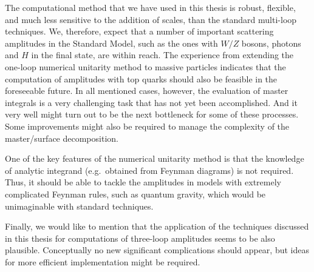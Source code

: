 The computational method that we have used in this thesis is robust, flexible,
and much less sensitive to the addition of scales, than the standard multi-loop techniques.
We, therefore, expect that a number of important scattering amplitudes
in the Standard Model, such as the ones with $W/Z$ bosons, photons and $H$ in the final state, are within reach.
The experience from extending the one-loop numerical unitarity method to massive particles indicates that
the computation of amplitudes with top quarks should also be feasible in the foreseeable future.
In all mentioned cases, however, the evaluation of master integrals is a very challenging task that has not yet been accomplished.
And it very well might turn out to be the next bottleneck for some of these processes.
Some improvements might also be required to manage the complexity of the master/surface decomposition.

One of the key features of the numerical unitarity method is that the knowledge of analytic integrand (e.g.\ obtained from Feynman diagrams) is not required.
Thus, it should be able to tackle the amplitudes in models with extremely complicated Feynman rules, such as quantum gravity,
which would be unimaginable with standard techniques.

Finally, we would like to mention that the application of the techniques discussed in this thesis for computations of three-loop amplitudes seems to
be also plausible. Conceptually no new significant complications should appear, but ideas for more efficient implementation might be required.




